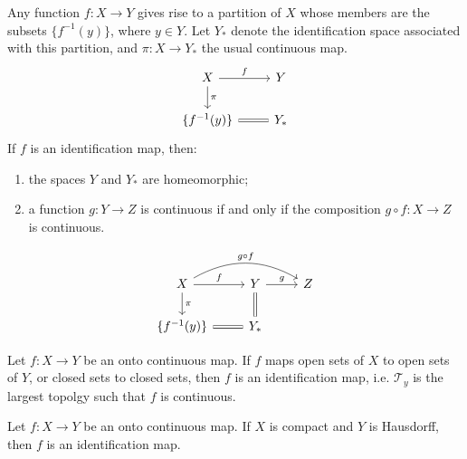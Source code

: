 \documentclass{article}
\begin{document}
\begin{thm}
    Any function $f:X\to Y$ gives rise to a partition of $X$ whose
    members are the subsets $\{f^{-1}(y)\}$, where $y\in Y$. Let $Y_*$
    denote the identification space associated with this partition,
    and $\pi:X\to Y_*$ the usual continuous map. 
    $$ \begin{tikzcd}[]
        X\ar[r,"f"]\ar[d,"\pi"] & Y \\
        \{f^{-1}(y)\} \ar[r,equal] & Y_*
    \end{tikzcd} $$
    If $f$ is an identification map, then:
    \begin{enumerate}
        \item the spaces $Y$ and $Y_*$ are homeomorphic;
        \item a function $g:Y\to Z$ is continuous if and only if the
            composition $g\circ f:X\to Z$ is continuous.
    \end{enumerate}
    $$ \begin{tikzcd}[]
        X\ar[r,"f"]\ar[d,"\pi"]\ar[rr,"g\circ f",bend left] 
            & Y\ar[d,equal,"~"]\ar[r,"g"] & Z \\
        \{f^{-1}(y)\} \ar[r,equal] & Y_*
    \end{tikzcd} $$
\end{thm}
\begin{thm}
    Let $f:X\to Y$ be an onto continuous map. If $f$ maps open sets of
    $X$ to open sets of $Y$, or closed sets to closed sets, then $f$
    is an identification map, i.e. $\mathcal{T}_y$ is the largest
    topolgy such that $f$ is continuous.
\end{thm}
\begin{coro}
    \label{coro:idmap-coro}
    Let $f:X\to Y$ be an onto continuous map. If $X$ is compact and
    $Y$ is Hausdorff, then $f$ is an identification map.
\end{coro}
\end{document}
